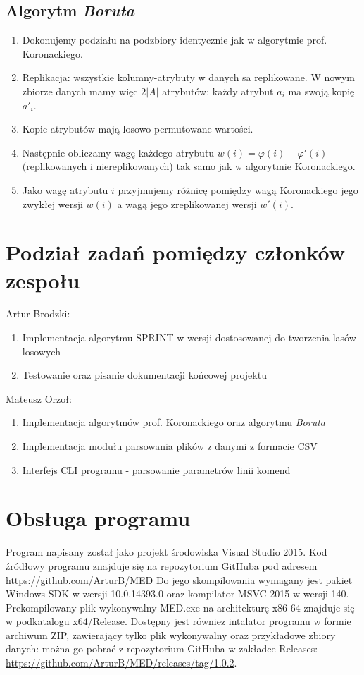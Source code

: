\documentclass{article}
\begin{document}
\subsection{Algorytm \emph{Boruta}}
\begin{enumerate}
	\item Dokonujemy podziału na podzbiory identycznie jak w algorytmie prof. Koronackiego. 
	\item Replikacja: wszystkie kolumny-atrybuty w danych sa replikowane. W	nowym zbiorze danych mamy więc $2\left|A\right|$ atrybutów: każdy atrybut $a_i$ ma swoją kopię $a'_i$. 
	\item Kopie atrybutów mają losowo permutowane wartości. 
	\item Następnie obliczamy wagę każdego atrybutu $w(i) = \varphi(i) − \varphi'(i)$ (replikowanych i niereplikowanych) tak samo jak w algorytmie Koronackiego. 
	\item  Jako wagę atrybutu $i$ przyjmujemy różnicę pomiędzy wagą Koronackiego jego zwykłej wersji $w(i)$ a wagą jego zreplikowanej wersji $w'(i)$.
\end{enumerate}

\section{Podział zadań pomiędzy członków zespołu}

Artur Brodzki:
\begin{enumerate}
	\item Implementacja algorytmu SPRINT w wersji dostosowanej do tworzenia lasów losowych
	\item Testowanie oraz pisanie dokumentacji końcowej projektu
\end{enumerate}
Mateusz Orzoł:
\begin{enumerate}
	\item Implementacja algorytmów prof. Koronackiego oraz algorytmu \emph{Boruta}
	\item Implementacja modułu parsowania plików z danymi z formacie CSV
	\item Interfejs CLI programu - parsowanie parametrów linii komend
\end{enumerate}

\section{Obsługa programu}

Program napisany został jako projekt środowiska Visual Studio 2015. Kod źródłowy programu znajduje się na repozytorium GitHuba pod adresem \url{https://github.com/ArturB/MED} Do jego skompilowania wymagany jest pakiet Windows SDK w wersji 10.0.14393.0 oraz kompilator MSVC 2015 w wersji 140. Prekompilowany plik wykonywalny MED.exe na architekturę x86-64 znajduje się w podkatalogu x64/Release. Dostępny jest równiez intalator programu w formie archiwum ZIP, zawierający tylko plik wykonywalny oraz przykładowe zbiory danych: można go pobrać z repozytorium GitHuba w zakładce Releases: \url{https://github.com/ArturB/MED/releases/tag/1.0.2}. 
\end{document}
